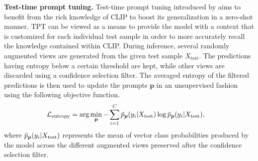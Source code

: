 \documentclass[a4paper]{article}
\begin{document}
\noindent
\textbf{Test-time prompt tuning. } Test-time prompt tuning introduced by \cite{shu2022test} aims to benefit from the rich knowledge of CLIP to boost its generalization
in a zero-shot manner. TPT can be viewed  as a means to provide the model with a context that is customized for each individual test sample in order to more accurately recall the knowledge contained within CLIP. During inference, several
randomly augmented views are generated from the given test sample $X_{\text{test}}$. The predictions having entropy below a certain threshold are kept, while other views are discarded using a confidence selection filter. The averaged entropy of the filtered predictions is then used to update the prompts $\bm{p}$ in an unsupervised fashion using the following objective function.
\begin{align}
\label{eq:ent-min}
    \mathcal{L}_{\text{entropy}}= \text{arg}&\min_{\bm{p}}-\sum_{i=1}^{C}\Tilde{p}_{\bm p} (y_i|X_{\text{test}}) \log \Tilde{p}_{\bm p}(y_i|X_{\text{test}}),
\end{align}
where $\Tilde{p}_{\bm p}(y_i|X_{\text{test}})$ represents the mean of vector class probabilities produced by the model across the different augmented views preserved after the confidence selection filter. 
\end{document}
